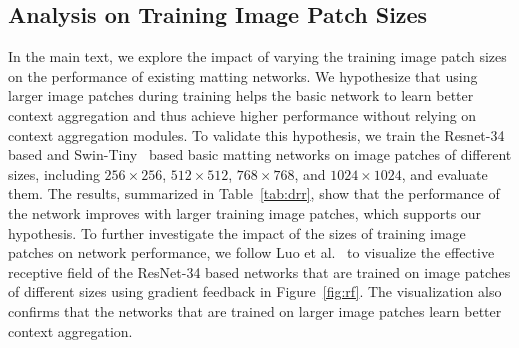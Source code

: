 \documentclass[10pt,twocolumn,letterpaper]{article}
\begin{document}
\subsection{Analysis on Training Image Patch Sizes}
In the main text, we explore the impact of varying the training image patch sizes on the performance of existing matting networks.
We hypothesize that using larger image patches during training helps the basic network to learn better context aggregation and thus achieve higher performance without relying on context aggregation modules. 
To validate this hypothesis, we train the Resnet-34~\cite{he2016deep} based and Swin-Tiny~\cite{liu2021Swin} based basic matting networks on image patches of different sizes, including $256 \times 256$, $512 \times 512$, $768 \times 768$, and $1024 \times 1024$, and evaluate them. 
The results, summarized in Table~\ref{tab:drr}, show that the performance of the network improves with larger training image patches, which supports our hypothesis.
To further investigate the impact of the sizes of training image patches on network performance, we follow Luo et al.~\cite{luo2016understanding} to visualize the effective receptive field of the ResNet-34 based networks that are trained on image patches of different sizes using gradient feedback in Figure~\ref{fig:rf}. 
The visualization also confirms that the networks that are trained on larger image patches learn better context aggregation.

\begin{table}[!t]
  \centering
  \caption{Diagnostic experiment on the size of training image patches. }
  \label{tab:drr}\end{table}
\end{document}
